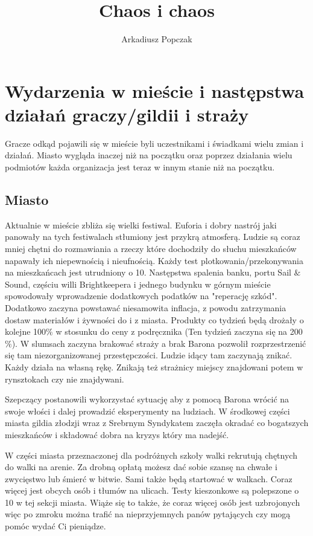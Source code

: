 \documentclass{article}
\title{\Huge{Chaos i chaos}}
\author{Arkadiusz Popczak}
\begin{document}
\maketitle

\section*{Wydarzenia w mieście i następstwa działań graczy/gildii i straży}
    Gracze odkąd pojawili się w mieście byli uczestnikami i świadkami wielu zmian i działań. Miasto wygląda inaczej niż na początku oraz poprzez działania wielu podmiotów każda organizacja jest teraz w innym stanie niż na początku.

\subsection*{Miasto}
    Aktualnie w mieście zbliża się wielki festiwal. Euforia i dobry nastrój jaki panowały na tych festiwalach stłumiony jest przykrą atmosferą. Ludzie są coraz mniej chętni do rozmawiania a rzeczy które dochodziły do słuchu mieszkańców napawały ich niepewnością i nieufnością. Każdy test plotkowania/przekonywania na mieszkańcach jest utrudniony o 10. Następstwa spalenia banku, portu Sail $\&$ Sound, częściu willi Brightkeepera i jednego budynku w górnym mieście spowodowały wprowadzenie dodatkowych podatków na "reperację szkód". Dodatkowo zaczyna powstawać niesamowita inflacja, z powodu zatrzymania dostaw materiałów i żywności do i z miasta. Produkty co tydzień będą drożały o kolejne 100$\%$ w stosunku do ceny z podręcznika  (Ten tydzień zaczyna się na 200$\%$). W slumsach zaczyna brakować straży a brak Barona pozwolił rozprzestrzenić się tam niezorganizowanej przestępczości. Ludzie idący tam zaczynają znikać. Każdy działa na własną rękę. Znikają też strażnicy miejscy znajdowani potem w rynsztokach czy nie znajdywani.

    Szepczący postanowili wykorzystać sytuację aby z pomocą Barona wrócić na swoje włości i dalej prowadzić eksperymenty na ludziach. W środkowej części miasta gildia złodzji wraz z Srebrnym Syndykatem zaczęła okradać co bogatszych mieszkańców i składować dobra na kryzys który ma nadejść.

    W części miasta przeznaczonej dla podróżnych szkoły walki rekrutują chętnych do walki na arenie. Za drobną opłatą możesz dać sobie szansę na chwałe i zwycięstwo lub śmierć w bitwie. Sami także będą startować w walkach. Coraz więcej jest obcych osób i tłumów na ulicach. Testy kieszonkowe są polepszone o 10 w tej sekcji miasta. Wiąże się to także, że coraz więcej osób jest uzbrojonych więc po zmroku można trafić na nieprzyjemnych panów pytających czy mogą pomóc wydać Ci pieniądze.
\end{document}

